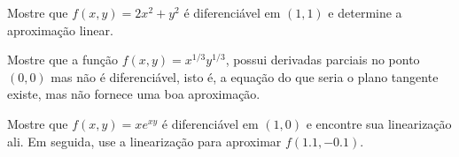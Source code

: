 \begin{frame}[label=der-parciais]
\begin{exe}
Mostre que $f(x,y)=2x^2+y^2$ é diferenciável em $(1,1)$ e determine a aproximação linear.
\end{exe}

\begin{exe}
Mostre que a função $f(x,y)=x^{1/3}y^{1/3}$, possui derivadas parciais no ponto $(0,0)$ mas não é diferenciável, isto é, a equação do que seria o plano tangente existe, mas não fornece uma boa aproximação.
\end{exe}
\end{frame}


%
%		


\begin{frame}[label=der-parciais]
	
	
	
	\begin{exe}
	Mostre que $f(x, y) = xe^{xy}$ é diferenciável em $(1, 0)$ e encontre sua linearização ali. Em seguida, use a linearização para aproximar $f( 1.1,-0.1)$.
	\end{exe}
\end{frame}


